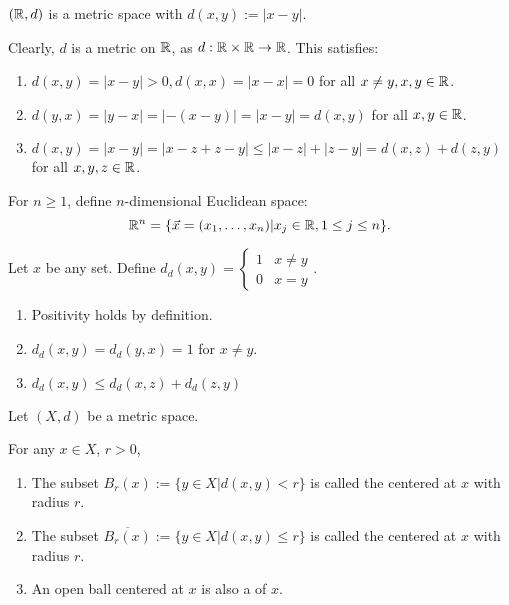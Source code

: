 \documentclass{book}
\begin{document}
\begin{ex}
    $(\mathbb{R}, d)$ is a metric space with $d(x, y) := |x - y|$. 
\end{ex}

Clearly, $d$ is a metric on $\mathbb{R}$, as $d : \mathbb{R} \times \mathbb{R} \to \mathbb{R}$. This satisfies:
\begin{enumerate}
    \item $d(x, y) = |x - y| > 0, d(x, x) = |x - x| = 0$ for all $x \neq y, x, y \in \mathbb{R}$.
    \item $d(y, x) = |y - x| = |-(x - y)| = |x - y| = d(x, y)$ for all $x, y \in \mathbb{R}$.
    \item $d(x, y) = |x - y| = |x - z + z - y| \leq |x - z| + |z - y| = d(x, z) + d(z, y)$ for all $x, y, z \in \mathbb{R}$.
\end{enumerate}

\begin{defn}
    For $n \geq 1$, define $n$-dimensional Euclidean space:
    \[\mathbb{R}^n = \{\vec x = (x_1, \ldots, x_n) | x_j \in \mathbb{R}, 1 \leq j \leq n \}.\] 
\end{defn}

\begin{ex}
    Let $x$ be any set. Define $d_d(x, y) = \begin{cases} 1 & x \neq y \\ 0 & x = y \end{cases}$.
\end{ex}
\begin{enumerate}
    \item Positivity holds by definition.
    \item $d_d (x, y) = d_d (y, x) = 1$ for $x \neq y$.
    \item $d_d (x, y) \leq d_d (x, z) + d_d (z, y)$
\end{enumerate}

\begin{defn}[balls]
    Let $(X, d)$ be a metric space.
    
    For any $x \in X$, $r > 0$,
    \begin{enumerate}
        \item The subset $B_r(x) := \{y \in X | d(x, y) < r\}$ is called the  centered at $x$ with radius $r$.
        \item The subset $\overline{B_r(x)} := \{y \in X | d(x, y) \leq r\}$ is called the  centered at $x$ with radius $r$.
        \item An open ball centered at $x$ is also a  of $x$.
    \end{enumerate}
\end{defn}
\end{document}
